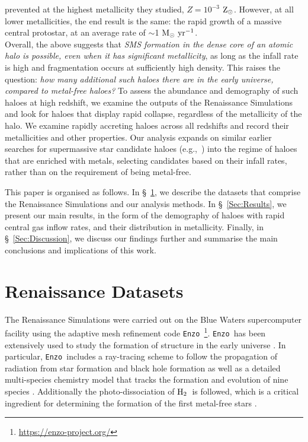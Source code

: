 \documentclass[twocolumn,iop,revtex4]{openjournal}
\newcommand{\enzo}{\texttt{Enzo~}}
\newcommand{\msolaryrc} {$\rm{M_{\odot}~yr^{-1}}$}
\newcommand{\zsolarc} {$\rm{Z_{\odot}}$}
\newcommand{\molH} {$\rm{H_2}$~}
\begin{document}
  prevented at the highest metallicity they studied, $Z=10^{-3}$ \zsolarc. However, at all
  lower metallicities, the end result is the same: the rapid growth of a massive central protostar,
  at an average rate of $\sim$1 \msolaryrc.\\
  \indent Overall, the above suggests that {\em SMS formation in the dense core of an atomic halo is possible,
    even when it has significant metallicity}, as long as the infall rate is high and fragmentation occurs at sufficiently high density.
This raises the question: {\em how many additional such haloes there are in the early universe, compared to metal-free haloes?}
To assess the abundance and demography of such haloes at high redshift, we examine the outputs of the Renaissance Simulations
and look for haloes that display rapid collapse, regardless of the metallicity of the halo.
We examine rapidly accreting haloes across all redshifts and record their metallicities and other properties.
Our analysis expands on similar earlier searches for supermassive star candidate haloes
(e.g.,~\citealt{Habouzit_2016,Tremmel_2017,Dunn_2018,Wise_2019,Regan_2020}) into the regime of haloes that are enriched with
metals, selecting candidates based on their infall rates, rather than on the requirement of being metal-free.

This paper is organised as follows.
In \S~\ref{Sec:RenaissanceDatasets}, we describe the datasets that comprise the Renaissance Simulations
and our analysis methods.
In \S~\ref{Sec:Results}, we present  our main results, in the form of the demography of
haloes with rapid central gas inflow rates, and their distribution in metallicity.  
Finally, in \S~\ref{Sec:Discussion}, 
we discuss our findings further and summarise the main conclusions and implications of this work.

\section{Renaissance Datasets} \label{Sec:RenaissanceDatasets}
The Renaissance Simulations were carried out on the Blue Waters supercomputer facility using the
adaptive mesh refinement code \enzo\citep{Enzo_2014, Enzo_2019}\footnote{\url{https://enzo-project.org/}}.
\enzo has been extensively used to study the formation of structure in the early universe
\citep{Abel_2002, OShea_2005b, Turk_2012, Wise_2012b, Wise_2014, Regan_2015, Regan_2017}. In
particular, \enzo includes a ray-tracing scheme to follow the propagation of radiation from star
formation and
black hole formation \citep{WiseAbel_2011} as well as a detailed multi-species chemistry model that
tracks the formation and evolution of nine species \citep{Anninos_1997, Abel_1997, Grackle}.
Additionally the photo-dissociation of \molH is followed, which is a critical ingredient for
determining the formation of the first metal-free stars \citep{Haiman_2000}.
\end{document}
